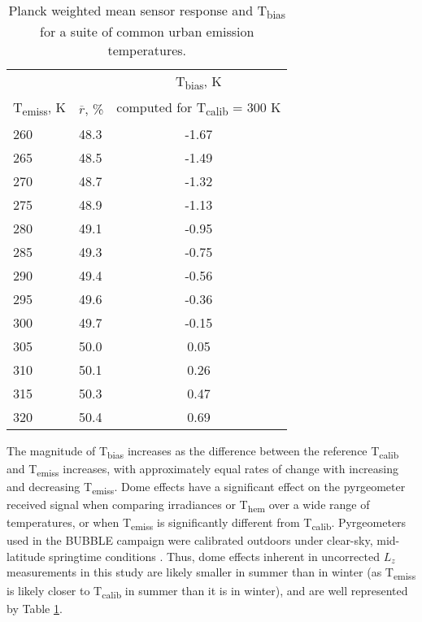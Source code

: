 \begin{table}[H]
	\centering
	\caption{Planck weighted mean sensor response and T\textsubscript{bias} for a suite of common urban emission temperatures.}
	\label{nonuniformsen}
	\begin{tabular}{p{1.5cm}p{1.5cm}c}
		\toprule 
		& & T\textsubscript{bias}, \si{\kelvin} \\
		T\textsubscript{emiss}, \si{\kelvin}& $\overline{r}$, \% & computed for T\textsubscript{calib} = 300 \si{\kelvin} \\ \midrule
		260 & 48.3 & -1.67 \\ 
		265 & 48.5 & -1.49 \\ 
		270 & 48.7 & -1.32 \\ 
		275 & 48.9 & -1.13 \\ 
		280 & 49.1 & -0.95 \\ 
		285 & 49.3 & -0.75 \\ 
		290 & 49.4 & -0.56 \\ 
		295 & 49.6 & -0.36 \\ 
		300 & 49.7 & -0.15 \\ 
		305 & 50.0 & 0.05 \\ 
		310 & 50.1 & 0.26  \\ 
		315 & 50.3 & 0.47 \\ 
		320 & 50.4 & 0.69  \\
		\bottomrule
	\end{tabular} 
\end{table}

The magnitude of T\textsubscript{bias} increases as the difference between the reference T\textsubscript{calib} and T\textsubscript{emiss} increases, with approximately equal rates of change with increasing and decreasing T\textsubscript{emiss}. Dome effects have a significant effect on the pyrgeometer received signal when comparing irradiances or T\textsubscript{hem} over a wide range of temperatures, or when T\textsubscript{emiss} is significantly different from T\textsubscript{calib}. Pyrgeometers used in the BUBBLE campaign were calibrated outdoors under clear-sky, mid-latitude springtime conditions \citep{Christen2005}. Thus, dome effects inherent in uncorrected $L_z$ measurements in this study are likely smaller in summer than in winter (as T\textsubscript{emiss} is likely closer to T\textsubscript{calib} in summer than it is in winter), and are well represented by Table \ref{nonuniformsen}.


